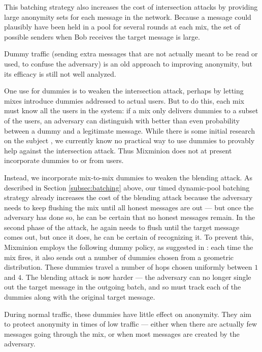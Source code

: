 \documentclass[times,10pt,twocolumn]{article}
\begin{document}
This batching strategy also increases the cost of intersection attacks by
providing large anonymity sets for each message in the network. Because
a message could plausibly have been held in a pool for several rounds
at each mix, the set of possible senders when Bob receives the target
message is large.


Dummy traffic (sending extra messages that are not actually meant to
be read or used, to confuse the adversary) is an old approach to
improving anonymity, but its efficacy is still not well analyzed.

One use for dummies is to weaken the intersection attack, perhaps by letting
mixes introduce dummies addressed to actual users. But to do this, each mix
must know all the users in the system: if a mix only delivers dummies to a
subset of the users, an adversary can distinguish with better than even
probability between a dummy and a legitimate message. While there is some
initial research on the subject \cite{langos02}, we currently know no
practical way to use dummies to provably help against the intersection
attack. Thus Mixminion does not at present incorporate dummies to or from
users.

Instead, we incorporate mix-to-mix dummies to weaken the blending attack.  As
described in
Section \ref{subsec:batching} above, our timed
dynamic-pool batching strategy already increases the cost of the blending attack
because the adversary needs to keep flushing the mix until all honest
messages are out --- but once the adversary has done so, he can be certain that no
honest messages remain. In the second phase of the attack, he again
needs to flush until the target message comes out, but once it does, he
can be certain of recognizing it. To prevent this, Mixminion employs the following
dummy policy, as suggested in \cite{trickle02}:
each time the mix
fires, it also sends out a number of dummies chosen from a geometric
distribution. These dummies travel a number of hops chosen uniformly
between $1$ and $4$. The blending attack is now harder --- the adversary
can no longer single out the target message in the outgoing batch, and so
must track each of the dummies along with the original target message.

During normal traffic, these dummies have little effect on anonymity. They
aim to protect anonymity in times of low traffic --- either when there are
actually few messages going through the mix, or when most messages are
created by the adversary.
\end{document}
